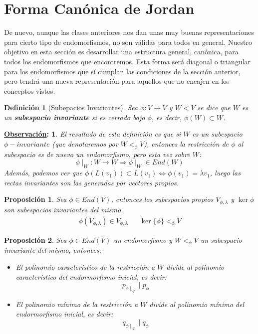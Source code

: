 \documentclass[10pt,a4paper,openright]{book}
\theoremstyle{break}
\newtheorem*{defi}{Definición}
\newtheorem*{prop}{Proposición}
\newtheorem*{obs}{\underline{Observación}:}
\begin{document}
\section{Forma Canónica de Jordan}
De nuevo, aunque las clases anteriores nos dan unas muy buenas representaciones para cierto tipo de endomorfismos, no son válidas para todos en general. Nuestro objetivo en esta sección es desarrollar una estructura general, canónica, para todos los endomorfismos que encontremos. Esta forma será diagonal o triangular para los endomorfismos que sí cumplan las condiciones de la sección anterior, pero tendrá una nueva representación para aquellos que no encajen en los conceptos vistos.

\begin{defi}[Subepacios Invariantes]
Sea $\phi: V\rightarrow V$ y $W<V$ se dice que $W$ es un \textbf{subespacio invariante} si es cerrado bajo $\phi$, es decir, $\phi(W)\subset W$.
\end{defi}

\begin{obs}
El resultado de esta definición es que si $W$ es un subespacio $\phi-invariante$ (que denotaremos por $W<_\phi V$), entonces la restricción de $\phi$ al subespacio es de nuevo un endomorfismo, pero esta vez sobre $W$:
$$\phi\mid_W: W\rightarrow W\Rightarrow \phi\mid_W\in End(W)$$
Además, podemos ver que $\phi(L(v_1))\subset L(v_1)\Leftrightarrow \phi(v_1)=\lambda v_1$, luego las rectas invariantes son las generadas por vectores propios.
\end{obs}

\begin{prop}
Sea $\phi\in End(V)$, entonces los subespacios propios $V_{\phi, \lambda}$ y $\ker \phi$ son subespacios invariantes del mismo.
\begin{align*}
\phi\left(V_{\phi,\lambda}\right)\in V_{\phi,\lambda} & & \ker\{\phi\}<_\phi V
\end{align*}
\end{prop}

\begin{prop}
Sea $\phi\in End(V)$ un endomorfismo y $W<_\phi V$ un subespacio invariante del mismo, entonces:
\begin{itemize}
\item El polinomio característico de la restricción a $W$ divide al polinomio característico del endormorfismo inicial, es decir:
$$p_{\phi\mid_W}\mid p_\phi$$

\item El polinomio mínimo de la restricción a $W$ divide al polinomio mínimo del endormorfismo inicial, es decir:
$$q_{\phi\mid_W}\mid q_\phi$$
\end{itemize}
\end{prop}
\end{document}
